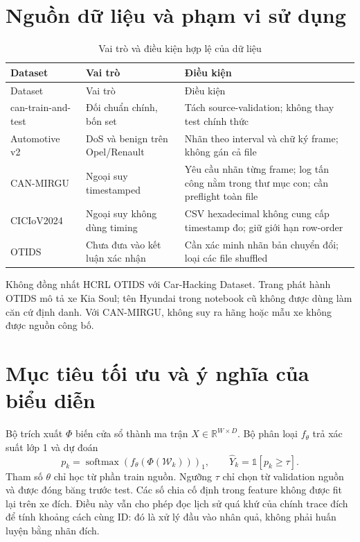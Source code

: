 \documentclass[12pt,a4paper,oneside,openany]{extbook}
\begin{document}
\section{Nguồn dữ liệu và phạm vi sử dụng}
\begin{longtable}{P{3.3cm}P{4.4cm}P{5.2cm}}
\caption{Vai trò và điều kiện hợp lệ của dữ liệu}\label{tab:datasets}\\\toprule
Dataset & Vai trò & Điều kiện\\\midrule\endfirsthead
\toprule Dataset & Vai trò & Điều kiện\\\midrule\endhead
can-train-and-test~\cite{lampe2024curated} & Đối chuẩn chính, bốn set & Tách source-validation; không thay test chính thức\\
Automotive v2~\cite{dupont2019automotive} & DoS và benign trên Opel/Renault & Nhãn theo interval và chữ ký frame; không gán cả file\\
CAN-MIRGU~\cite{rajapaksha2024canmirgu} & Ngoại suy timestamped & Yêu cầu nhãn từng frame; log tấn công nằm trong thư mục con; cần preflight toàn file\\
CICIoV2024~\cite{neto2024ciciov2024} & Ngoại suy không dùng timing & CSV hexadecimal không cung cấp timestamp đo; giữ giới hạn row-order\\
OTIDS~\cite{lee2017otids} & Chưa đưa vào kết luận xác nhận & Cần xác minh nhãn bản chuyển đổi; loại các file shuffled\\\bottomrule
\end{longtable}
Không đồng nhất HCRL OTIDS với Car-Hacking Dataset. Trang phát hành OTIDS mô tả xe Kia Soul; tên Hyundai trong notebook cũ không được dùng làm căn cứ định danh. Với CAN-MIRGU, không suy ra hãng hoặc mẫu xe không được nguồn công bố.

\section{Mục tiêu tối ưu và ý nghĩa của biểu diễn}
Bộ trích xuất $\Phi$ biến cửa sổ thành ma trận $X\in\mathbb{R}^{W\times D}$. Bộ phân loại $f_\theta$ trả xác suất lớp 1 và dự đoán
\begin{equation}
p_k=\operatorname{softmax}(f_\theta(\Phi(\mathcal{W}_k)))_1,
\qquad \widehat Y_k=\mathbb{1}[p_k\geq\tau].
\end{equation}
Tham số $\theta$ chỉ học từ phần train nguồn. Ngưỡng $\tau$ chỉ chọn từ validation nguồn và được đóng băng trước test. Các số chia cố định trong feature không được fit lại trên xe đích. Điều này vẫn cho phép đọc lịch sử quá khứ của chính trace đích để tính khoảng cách cùng ID: đó là xử lý đầu vào nhân quả, không phải huấn luyện bằng nhãn đích.
\end{document}
